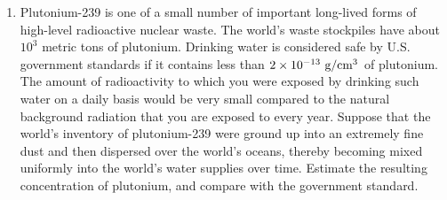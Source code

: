 \begin{enumerate}

\vspace{1.5mm}

\item 
Plutonium-239 is one of a small number of important long-lived forms of high-level
radioactive nuclear waste. The world's waste stockpiles have about $10^3$ metric tons
of plutonium. Drinking water is considered safe by U.S. government standards if it
contains less than $2\times10^{-13}\ \textup{g}/\textup{cm}^3$ of plutonium.
The amount of radioactivity to which you were exposed by drinking such water
on a daily basis would be very small compared to the natural background radiation that you are
exposed to every year. Suppose that the world's inventory of plutonium-239 were ground
up into an extremely fine dust and then dispersed over the world's oceans, thereby
becoming mixed uniformly into the world's water supplies over time.
Estimate the resulting concentration of plutonium, and compare with the government standard.

\end{enumerate}


